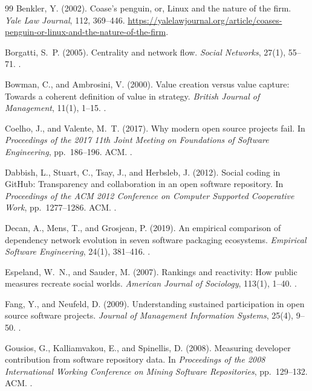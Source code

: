\begin{thebibliography}{99}
\label{refs:chapter02}
Benkler, Y. (2002).
Coase's penguin, or, Linux and the nature of the firm.
\emph{Yale Law Journal}, 112, 369--446.
\url{https://yalelawjournal.org/article/coases-penguin-or-linux-and-the-nature-of-the-firm}.

Borgatti, S.~P. (2005).
Centrality and network flow.
\emph{Social Networks}, 27(1), 55--71.
.

Bowman, C., and Ambrosini, V. (2000).
Value creation versus value capture: Towards a coherent definition of value in strategy.
\emph{British Journal of Management}, 11(1), 1--15.
.

Coelho, J., and Valente, M.~T. (2017).
Why modern open source projects fail.
In \emph{Proceedings of the 2017 11th Joint Meeting on Foundations of Software Engineering}, pp.~186--196. ACM.
.

Dabbish, L., Stuart, C., Tsay, J., and Herbsleb, J. (2012).
Social coding in GitHub: Transparency and collaboration in an open software repository.
In \emph{Proceedings of the ACM 2012 Conference on Computer Supported Cooperative Work}, pp.~1277--1286. ACM.
.

Decan, A., Mens, T., and Grosjean, P. (2019).
An empirical comparison of dependency network evolution in seven software packaging ecosystems.
\emph{Empirical Software Engineering}, 24(1), 381--416.
.

Espeland, W.~N., and Sauder, M. (2007).
Rankings and reactivity: How public measures recreate social worlds.
\emph{American Journal of Sociology}, 113(1), 1--40.
.

Fang, Y., and Neufeld, D. (2009).
Understanding sustained participation in open source software projects.
\emph{Journal of Management Information Systems}, 25(4), 9--50.
.

Gousios, G., Kalliamvakou, E., and Spinellis, D. (2008).
Measuring developer contribution from software repository data.
In \emph{Proceedings of the 2008 International Working Conference on Mining Software Repositories}, pp.~129--132. ACM.
.


\end{thebibliography}
